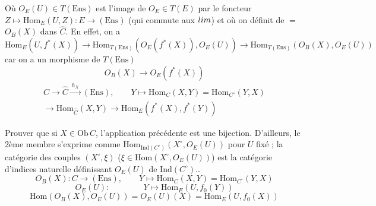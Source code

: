 \documentclass[11pt,a4paper]{article}
\begin{document}
Où $O_{E}(U) \in T(\mathrm{Ens})$ est l'image de $O_{E} \in T(E)$ par le
foncteur $Z \mapsto \mathrm{Hom}_{E}(U, Z) : E \to (\mathrm{Ens})$ (qui
commute aux $\varprojlim$) et où on définit de $=$ $O_{B}(X)$ dans
$\hat{C}$. En effet, on a
\[
  \mathrm{Hom}_{E}(U, f^{*}(X)) \longrightarrow
  \mathrm{Hom}_{T(\mathrm{Ens})}(O_{E}(f^{*}(X)), O_{E}(U))
  \longrightarrow \mathrm{Hom}_{T(\mathrm{Ens})}(O_{B}(X), O_{E}(U))
\]
car on a un morphisme de $T(\mathrm{Ens})$
\[
  O_{B}(X) \longrightarrow O_{E}(f^{*}(X))
\]
\begin{gather*}
  C \longrightarrow \hat{C} \xrightarrow{\ h_{X}\ } (\mathrm{Ens}),
  \qquad Y \longmapsto \mathrm{Hom}_{C}(X, Y) =
  \mathrm{Hom}_{C^{\circ}}(Y, X) \\
  \to \mathrm{Hom}_{\hat{C}}(X, Y)
  \to \mathrm{Hom}_{E}(f^{*}(X), f^{*}(Y))
\end{gather*}

Prouver que si $X \in \mathrm{Ob}\,C$, l'application précédente est
une bijection. D'ailleurs, le 2ème membre s'exprime comme
$\mathrm{Hom}_{\mathrm{Ind}(C^{\circ})}(X^{\circ}, O_{E}(U))$ pour $U$
fixé ; la catégorie des couples $(X^{\circ}, \xi)$ ($\xi \in
\mathrm{Hom}(X^{\circ}, O_{E}(U))$) est la catégorie d'indices naturelle
définissant  $O_{E}(U)$ de
$\mathrm{Ind}(C^{\circ})$…
\[
  O_{B}(X) : C \longrightarrow (\mathrm{Ens}), \qquad
  Y \longmapsto \mathrm{Hom}_{C}(X, Y) = \mathrm{Hom}_{C^{\circ}}(Y, X)
\]
\[
  O_{E}(U) : \qquad\qquad
  Y \longmapsto \mathrm{Hom}_{E}(U, f_{0}(Y))
\]
\[
  \mathrm{Hom}(O_{B}(X), O_{E}(U)) = O_{E}(U)(X) =
  \mathrm{Hom}_{E}(U, f_{0}(X))
\]
\end{document}
